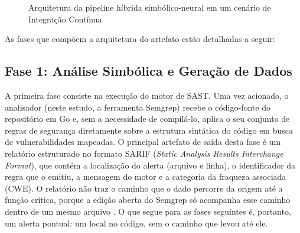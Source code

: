 \begin{figure}[htpb]
    \centering
    \caption{Arquitetura da pipeline híbrida simbólico-neural em um cenário de Integração Contínua}
    \label{fig:arquitetura}
    \fonteautores
\end{figure}

As fases que compõem a arquitetura do artefato estão detalhadas a seguir:

\subsection{Fase 1: Análise Simbólica e Geração de Dados}
A primeira fase consiste na execução do motor de SAST. Uma vez acionado, o analisador (neste estudo, a ferramenta Semgrep) recebe o código-fonte do repositório em Go e, sem a necessidade de compilá-lo, aplica o seu conjunto de regras de segurança diretamente sobre a estrutura sintática do código em busca de vulnerabilidades mapeadas. O principal artefato de saída desta fase é um relatório estruturado no formato SARIF (\textit{Static Analysis Results Interchange Format}), que contém a localização do alerta (arquivo e linha), o identificador da regra que o emitiu, a mensagem do motor e a categoria da fraqueza associada (CWE). O relatório não traz o caminho que o dado percorre da origem até a função crítica, porque a edição aberta do Semgrep só acompanha esse caminho dentro de um mesmo arquivo \cite{semgrepdocs}. O que segue para as fases seguintes é, portanto, um alerta pontual: um local no código, sem o caminho que levou até ele.


